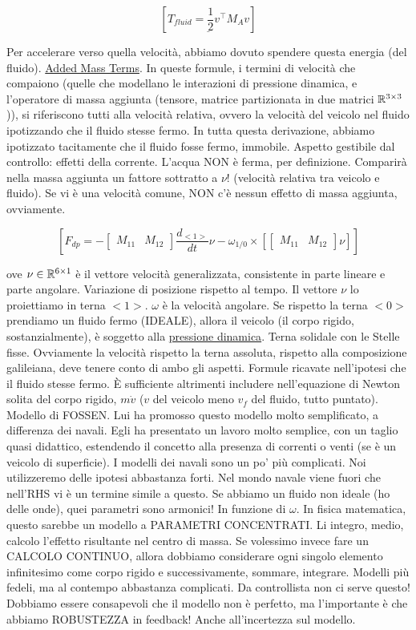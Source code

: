 \[
	[\underline{T_{fluid} = \frac{1}{2}v^\top M_A v}]
\]

Per accelerare verso quella velocità, abbiamo dovuto spendere questa energia (del fluido). \newline\underline{Added Mass Terms}. In queste formule, i termini di velocità che compaiono (quelle che modellano le interazioni di pressione dinamica, e l'operatore di massa aggiunta (tensore, matrice partizionata in due matrici $\mathbb{R}^{3\times 3}$)), si riferiscono tutti alla velocità relativa, ovvero la velocità del veicolo nel fluido ipotizzando che il fluido stesse fermo. In tutta questa derivazione, abbiamo ipotizzato tacitamente che il fluido fosse fermo, immobile. Aspetto gestibile dal controllo: effetti della corrente. L'acqua NON è ferma, per definizione. Comparirà nella massa aggiunta un fattore sottratto a $\nu$! (velocità relativa tra veicolo e fluido). Se vi è una velocità comune, NON c'è nessun effetto di massa aggiunta, ovviamente.

\[
	[F_{dp} = -\begin{bmatrix}M_{11}&M_{12}\end{bmatrix}\frac{d_{<1>}}{dt}\nu - \omega_{1/0}\times [\begin{bmatrix}M_{11}&M_{12}\end{bmatrix}\nu]]
\]

ove $\nu\in\mathbb{R}^{6\times 1}$ è il vettore velocità generalizzata, consistente in parte lineare e parte angolare. Variazione di posizione rispetto al tempo. Il vettore $\nu$ lo proiettiamo in terna $<1>$. $\omega$ è la velocità angolare. Se rispetto la terna $<0>$ prendiamo un fluido fermo (IDEALE), allora il veicolo (il corpo rigido, sostanzialmente), è soggetto alla \underline{pressione dinamica}. Terna solidale con le Stelle fisse. Ovviamente la velocità rispetto la terna assoluta, rispetto alla composizione galileiana, deve tenere conto di ambo gli aspetti. Formule ricavate nell'ipotesi che il fluido stesse fermo. \`E sufficiente altrimenti includere nell'equazione di Newton solita del corpo rigido, $m\dot{v}$ ($v$ del veicolo meno $v_f$ del fluido, tutto puntato). Modello di FOSSEN. Lui ha promosso questo modello molto semplificato, a differenza dei navali. Egli ha presentato un lavoro molto semplice, con un taglio quasi didattico, estendendo il concetto alla presenza di correnti o venti (se è un veicolo di superficie). I modelli dei navali sono un po' più complicati. Noi utilizzeremo delle ipotesi abbastanza forti. Nel mondo navale viene fuori che nell'RHS vi è un termine simile a questo. Se abbiamo un fluido non ideale (ho delle onde), quei parametri sono armonici! In funzione di $\omega$. In fisica matematica, questo sarebbe un modello a PARAMETRI CONCENTRATI. Li integro, medio, calcolo l'effetto risultante nel centro di massa. Se volessimo invece fare un CALCOLO CONTINUO, allora dobbiamo considerare ogni singolo elemento infinitesimo come corpo rigido e successivamente, sommare, integrare. Modelli più fedeli, ma al contempo abbastanza complicati. Da controllista non ci serve questo! Dobbiamo essere consapevoli che il modello non è perfetto, ma l'importante è che abbiamo ROBUSTEZZA in feedback! Anche all'incertezza sul modello.

